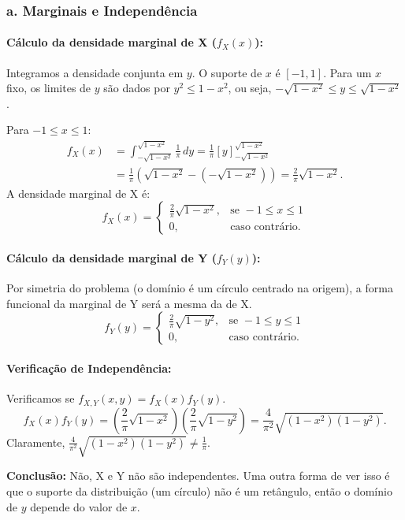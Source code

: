 \documentclass[12pt]{article}
\begin{document}
\subsubsection*{a. Marginais e Independência}

\paragraph{Cálculo da densidade marginal de X ($f_X(x)$):}
Integramos a densidade conjunta em $y$. O suporte de $x$ é $[-1, 1]$. Para um $x$ fixo, os limites de $y$ são dados por $y^2 \le 1-x^2$, ou seja, $-\sqrt{1-x^2} \le y \le \sqrt{1-x^2}$.

Para $-1 \le x \le 1$:
\begin{align*}
f_X(x) &= \int_{-\sqrt{1-x^2}}^{\sqrt{1-x^2}} \frac{1}{\pi} \,dy = \frac{1}{\pi} [y]_{-\sqrt{1-x^2}}^{\sqrt{1-x^2}} \\
&= \frac{1}{\pi} (\sqrt{1-x^2} - (-\sqrt{1-x^2})) = \frac{2}{\pi}\sqrt{1-x^2}.
\end{align*}
A densidade marginal de X é:
\[ f_X(x) = \begin{cases} \frac{2}{\pi}\sqrt{1-x^2}, & \text{se } -1 \le x \le 1 \\ 0, & \text{caso contrário.} \end{cases} \]

\paragraph{Cálculo da densidade marginal de Y ($f_Y(y)$):}
Por simetria do problema (o domínio é um círculo centrado na origem), a forma funcional da marginal de Y será a mesma da de X.
\[ f_Y(y) = \begin{cases} \frac{2}{\pi}\sqrt{1-y^2}, & \text{se } -1 \le y \le 1 \\ 0, & \text{caso contrário.} \end{cases} \]

\paragraph{Verificação de Independência:}
Verificamos se $f_{X,Y}(x,y) = f_X(x)f_Y(y)$.
\[ f_X(x)f_Y(y) = \left(\frac{2}{\pi}\sqrt{1-x^2}\right) \left(\frac{2}{\pi}\sqrt{1-y^2}\right) = \frac{4}{\pi^2}\sqrt{(1-x^2)(1-y^2)}. \]
Claramente, $\frac{4}{\pi^2}\sqrt{(1-x^2)(1-y^2)} \neq \frac{1}{\pi}$.

\textbf{Conclusão:} Não, X e Y não são independentes. Uma outra forma de ver isso é que o suporte da distribuição (um círculo) não é um retângulo, então o domínio de $y$ depende do valor de $x$.
\end{document}
